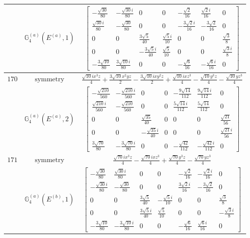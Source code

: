\documentclass[fleqn,8pt,landscape]{jsarticle}
\begin{document}
\begin{longtable}{ccc}
$  $ & $ \mathbb{G}_{4}^{(a)}(E^{(a)},1) $ & $ \begin{bmatrix} - \frac{\sqrt{30}}{80} & - \frac{\sqrt{30} i}{80} & 0 & 0 & - \frac{\sqrt{2}}{16} & \frac{\sqrt{2} i}{16} & 0 \\ \frac{\sqrt{30} i}{80} & - \frac{\sqrt{30}}{80} & 0 & 0 & - \frac{3 \sqrt{2} i}{16} & - \frac{3 \sqrt{2}}{16} & 0 \\ 0 & 0 & \frac{3 \sqrt{5}}{40} & \frac{\sqrt{5} i}{10} & 0 & 0 & \frac{\sqrt{3}}{8} \\ 0 & 0 & - \frac{3 \sqrt{5} i}{40} & \frac{\sqrt{5}}{10} & 0 & 0 & \frac{\sqrt{3} i}{8} \\ - \frac{3 \sqrt{10}}{80} & \frac{3 \sqrt{10} i}{80} & 0 & 0 & - \frac{\sqrt{6}}{16} & - \frac{\sqrt{6} i}{16} & 0 \end{bmatrix} $ \\ \hline
$ 170 $ & $ \text{symmetry} $ & $ \frac{\sqrt{10} i x^{3} z}{4} + \frac{3 \sqrt{10} x^{2} y z}{2} - \frac{3 \sqrt{10} i x y^{2} z}{2} + \frac{\sqrt{10} i x z^{3}}{4} - \frac{\sqrt{10} y^{3} z}{4} - \frac{\sqrt{10} y z^{3}}{4} $ \\
$  $ & $ \mathbb{G}_{4}^{(a)}(E^{(a)},2) $ & $ \begin{bmatrix} - \frac{\sqrt{210}}{560} & - \frac{\sqrt{210} i}{560} & 0 & 0 & - \frac{9 \sqrt{14}}{112} & \frac{9 \sqrt{14} i}{112} & 0 \\ \frac{\sqrt{210} i}{560} & - \frac{\sqrt{210}}{560} & 0 & 0 & \frac{5 \sqrt{14} i}{112} & \frac{5 \sqrt{14}}{112} & 0 \\ 0 & 0 & \frac{\sqrt{35}}{40} & 0 & 0 & 0 & \frac{\sqrt{21}}{56} \\ 0 & 0 & - \frac{\sqrt{35} i}{40} & 0 & 0 & 0 & \frac{\sqrt{21} i}{56} \\ \frac{3 \sqrt{70}}{80} & - \frac{3 \sqrt{70} i}{80} & 0 & 0 & - \frac{\sqrt{42}}{112} & - \frac{\sqrt{42} i}{112} & 0 \end{bmatrix} $ \\ \hline
$ 171 $ & $ \text{symmetry} $ & $ \frac{\sqrt{70} i x^{3} z}{4} - \frac{\sqrt{70} i x z^{3}}{4} + \frac{\sqrt{70} y^{3} z}{4} - \frac{\sqrt{70} y z^{3}}{4} $ \\
$  $ & $ \mathbb{G}_{4}^{(a)}(E^{(b)},1) $ & $ \begin{bmatrix} - \frac{\sqrt{30}}{80} & \frac{\sqrt{30} i}{80} & 0 & 0 & - \frac{\sqrt{2}}{16} & - \frac{\sqrt{2} i}{16} & 0 \\ - \frac{\sqrt{30} i}{80} & - \frac{\sqrt{30}}{80} & 0 & 0 & \frac{3 \sqrt{2} i}{16} & - \frac{3 \sqrt{2}}{16} & 0 \\ 0 & 0 & \frac{3 \sqrt{5}}{40} & - \frac{\sqrt{5} i}{10} & 0 & 0 & \frac{\sqrt{3}}{8} \\ 0 & 0 & \frac{3 \sqrt{5} i}{40} & \frac{\sqrt{5}}{10} & 0 & 0 & - \frac{\sqrt{3} i}{8} \\ - \frac{3 \sqrt{10}}{80} & - \frac{3 \sqrt{10} i}{80} & 0 & 0 & - \frac{\sqrt{6}}{16} & \frac{\sqrt{6} i}{16} & 0 \end{bmatrix} $ \\ \hline

\end{longtable}
\end{document}
